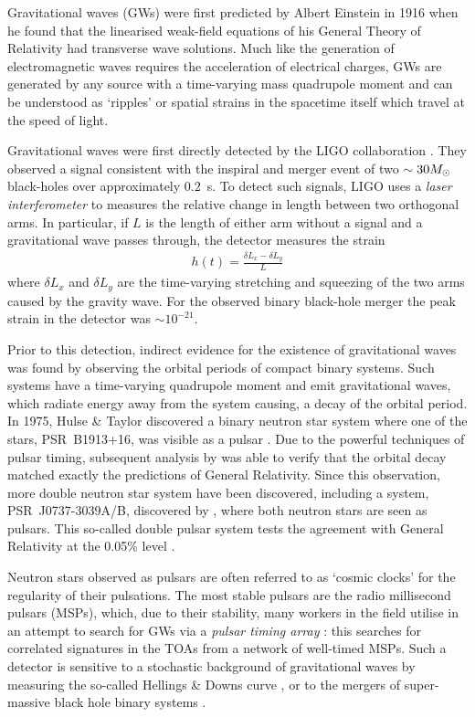 Gravitational waves (GWs) were first predicted by Albert Einstein in 1916
\citep{einstein1916approximative} when he found that the linearised weak-field
equations of his General Theory of Relativity had transverse wave solutions.
Much like the generation of electromagnetic waves requires the acceleration of
electrical charges, GWs are generated by any source with a
time-varying mass quadrupole moment and can be understood as `ripples' or
spatial strains in the spacetime itself which travel at the speed of light.

Gravitational waves were first directly detected by the LIGO collaboration
\citep{abbott2016observation}. They observed a signal consistent with the
inspiral and merger event of two $\sim 30 M_{\odot}$ black-holes over approximately
$0.2$~s. To detect such signals, LIGO uses a \emph{laser interferometer} to
measures the relative change in length between two orthogonal arms. In
particular, if $L$ is the length of either arm without a signal and a
gravitational wave passes through, the detector measures the strain
\begin{align}
h(t) = \frac{\delta L_x - \delta L_y}{L}
\end{align}
where $\delta L_x$ and $\delta L_y$ are the time-varying stretching and
squeezing of the two arms caused by the gravity wave. For the observed binary
black-hole merger the peak strain in the detector was $\sim 10^{-21}$.

Prior to this detection, indirect evidence for the existence of gravitational
waves was found by observing the orbital periods of compact binary systems.
Such systems have a time-varying quadrupole moment and emit gravitational
waves, which radiate energy away from the system causing, a decay of the orbital
period. In 1975, Hulse \& Taylor discovered a binary neutron star system where
one of the stars, PSR~B1913+16, was visible as a pulsar \citep{Hulse1975}. Due to
the powerful techniques of pulsar timing, subsequent analysis by
\citet{Taylor1982} was able to verify that the orbital decay matched exactly
the predictions of General Relativity. Since this observation, more double
neutron star system have been discovered, including a system, PSR~J0737-3039A/B,
discovered by \citet{burgay2003increased}, where both neutron stars are seen as
pulsars. This so-called double pulsar system tests the agreement with General
Relativity at the 0.05\% level \citep{kramerstairs2006}.

Neutron stars observed as pulsars are often referred to as `cosmic clocks' for
the regularity of their pulsations. The most stable pulsars are the radio
millisecond pulsars (MSPs), which, due to their stability, many workers in the field
utilise in an attempt to search for GWs via a \emph{pulsar timing array}
\citep{hobbs2010international}: this searches for correlated signatures in the
TOAs from a network of well-timed MSPs. Such a detector is sensitive to a
stochastic background of gravitational waves by measuring the so-called
Hellings \& Downs curve \citep{hellings1983upper}, or to the mergers of
super-massive black hole binary systems \citep{lee2011gravitational}.

